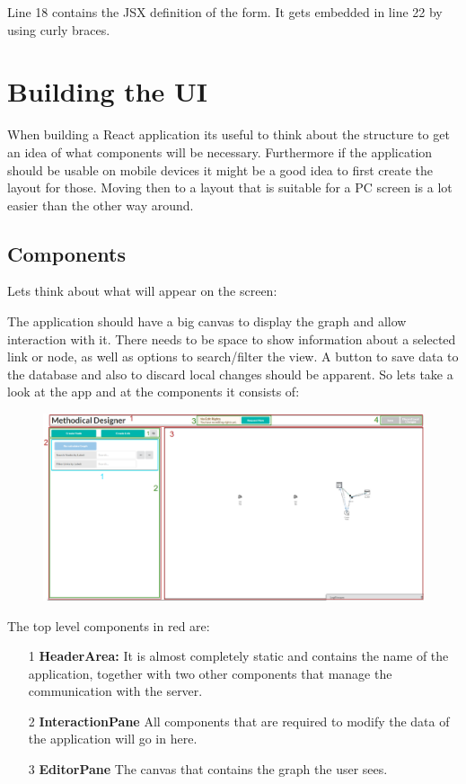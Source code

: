 Line 18 contains the JSX definition of the form. It gets embedded in line 22 by using curly braces.

\section{Building the UI}
When building a React application its useful to think about the structure to get an idea of what components will be necessary. Furthermore if the application should be usable on mobile devices it might be a good idea to first create the layout for those. Moving then to a layout that is suitable for a PC screen is a lot easier than the other way around.

\subsection{Components}
Lets think about what will appear on the screen:

The application should have a big canvas to display the graph and allow interaction with it. There needs to be space to show information about a selected link or node, as well as options to search/filter the view. A button to save data to the database and also to discard local changes should be apparent. So lets take a look at the app and at the components it consists of:
\begin{figure}[H]
\includegraphics[scale=.46]{Bilder/Layout.png}
\end{figure}
The top level components in red are:
\begin{itemize}
\item[1] \textbf{HeaderArea:} It is almost completely static and contains the name of the application, together with two other components that manage the communication with the server.
\item[2] \textbf{InteractionPane} All components that are required to modify the data of the application will go in here.
\item[3] \textbf{EditorPane} The canvas that contains the graph the user sees.
\end{itemize}


